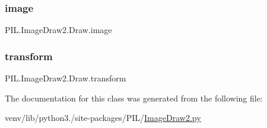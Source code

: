 \subsubsection{\texorpdfstring{image}{image}}
{\footnotesize\ttfamily P\+I\+L.\+Image\+Draw2.\+Draw.\+image}

\mbox{\label{classPIL_1_1ImageDraw2_1_1Draw_a00d4c90aa6bdb164ac6322caa35a6309}} 
\subsubsection{\texorpdfstring{transform}{transform}}
{\footnotesize\ttfamily P\+I\+L.\+Image\+Draw2.\+Draw.\+transform}



The documentation for this class was generated from the following file\+:\begin{DoxyCompactItemize}
\item 
venv/lib/python3./site-\/packages/\+P\+I\+L/\hyperlink{ImageDraw2_8py}{Image\+Draw2.\+py}\end{DoxyCompactItemize}

